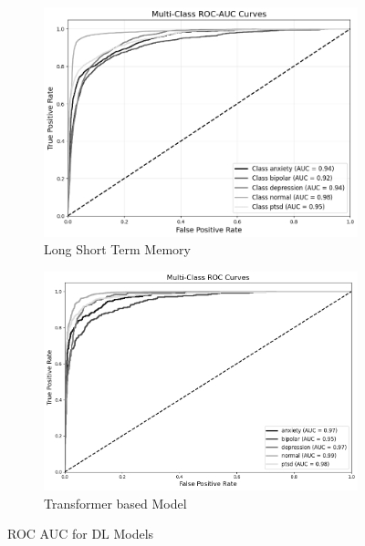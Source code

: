 \begin{figure}[H]
    \centering
    \begin{subfigure}[b]{0.49\textwidth}
        \centering
        \includegraphics[width=\textwidth]{Images/LSTM ROC.png}
        \caption{Long Short Term Memory}
        \label{LSTMROC}  %
    \end{subfigure}
    \hfill
    \begin{subfigure}[b]{0.49\textwidth}
        \centering
        \includegraphics[width=\textwidth]{Images/T ROC.png}
        \caption{Transformer based Model}
        \label{dfdl146}  %
    \end{subfigure}
    \label{fig:lstm_comparison}
    \caption{ROC AUC for DL Models}
    \vspace{0.75cm}

\end{figure}
